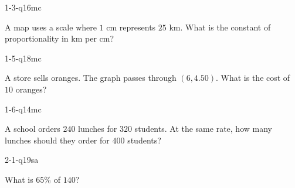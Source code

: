 
\begin{practiceQuestion}{1-3-q16}{mc}
\begin{questionText}
A map uses a scale where $1$ cm represents $25$ km. What is the constant of proportionality in km per cm?
\end{questionText}
\end{practiceQuestion}

\begin{practiceQuestion}{1-5-q18}{mc}
\begin{questionText}
A store sells oranges. The graph passes through $(6, 4.50)$. What is the cost of $10$ oranges?
\end{questionText}
\end{practiceQuestion}

\begin{practiceQuestion}{1-6-q14}{mc}
\begin{questionText}
A school orders $240$ lunches for $320$ students. At the same rate, how many lunches should they order for $400$ students?
\end{questionText}
\end{practiceQuestion}

\begin{practiceQuestion}{2-1-q19}{sa}
\begin{questionText}
What is $65\%$ of $140$?
\end{questionText}
\end{practiceQuestion}


